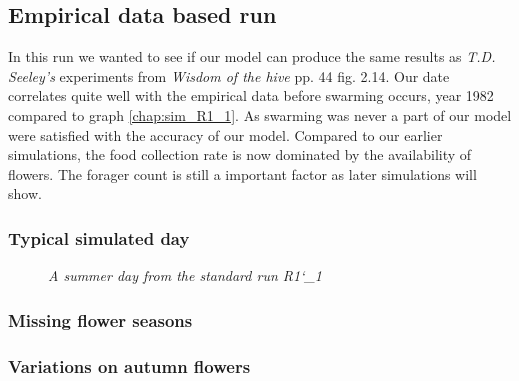 	\subsection{Empirical data based run}
	In this run we wanted to see if our model can produce the same results as \textit{T.D. Seeley's} experiments from \textit{Wisdom of the hive} pp. 44 fig. 2.14. Our date correlates quite well with the empirical data before swarming occurs, year 1982 compared to graph \ref{chap:sim_R1_1}. As swarming was never a part of our model were satisfied with the accuracy of our model.
	Compared to our earlier simulations, the food collection rate is now dominated by the availability of flowers. The forager count is still a important factor as later simulations will show.
	
	\subsubsection{Typical simulated day}
		\begin{figure}
			\centering
			\caption{\textit{A summer day from the standard run R1\char`_1}}
			\label{fig:day158}
		\end{figure}
	 
	\subsubsection{Missing flower seasons}
	\subsubsection{Variations on autumn flowers}
